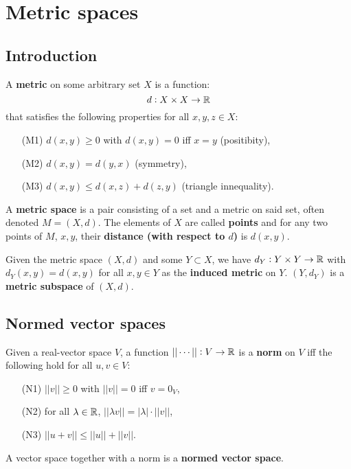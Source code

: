 \documentclass[../Year2.tex]{subfiles}
\begin{document}
\section{Metric spaces}

\subsection{Introduction}

\begin{definition}[Metric]
    A \textbf{metric} on some arbitrary set $X$ is a function: \[
        d:X\times X\rightarrow\mathbb{R}
    \] that satisfies the following properties for all $x,y,z\in X$: \begin{enumerate}
        \item[(M1)] $d(x,y)\geq 0$ with $d(x,y)=0$ iff $x=y$ (positibity),
        \item[(M2)] $d(x,y)=d(y,x)$ (symmetry),
        \item[(M3)] $d(x,y) \leq d(x,z) + d(z,y)$ (triangle innequality).
    \end{enumerate}
\end{definition}

\begin{definition}
    A \textbf{metric space} is a pair consisting of a set and a metric on said set, often denoted $M=(X,d)$. The elements of $X$ are called \textbf{points} and for any two points of $M$, $x,y$, their \textbf{distance (with respect to $d$)} is $d(x,y)$.
\end{definition}

\begin{definition}
    Given the metric space $(X,d)$ and some $Y\subset X$, we have $d_Y:Y\times Y\rightarrow\mathbb{R}$ with $d_Y(x,y)=d(x,y)$ for all $x,y\in Y$ as the \textbf{induced metric} on $Y$. $(Y,d_Y)$ is a \textbf{metric subspace} of $(X,d)$.
\end{definition}

\subsection{Normed vector spaces}

\begin{definition}
    Given a real-vector space $V$, a function $||\cdots||:V\rightarrow\mathbb{R}$ is a \textbf{norm} on $V$ iff the following hold for all $u,v\in V$:\begin{enumerate}
        \item[(N1)] $||v||\geq 0$ with $||v||=0$ iff $v=0_V$,
        \item[(N2)] for all $\lambda\in\mathbb{R}$, $||\lambda v|| = |\lambda|\cdot||v||$,
        \item[(N3)] $||u+v||\leq||u||+||v||$.
    \end{enumerate} A vector space together with a norm is a \textbf{normed vector space}.
\end{definition}
\end{document}
